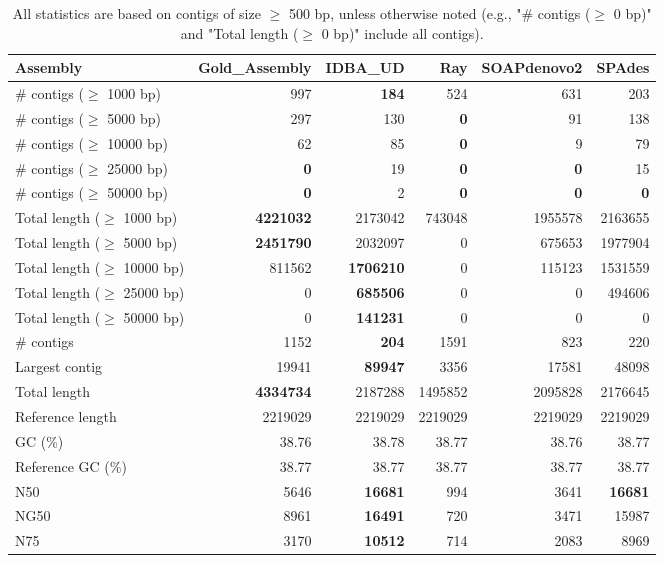 \documentclass[12pt,a4paper]{article}
\begin{document}
\begin{table}[ht]
\begin{center}
\caption{All statistics are based on contigs of size $\geq$ 500 bp, unless otherwise noted (e.g., "\# contigs ($\geq$ 0 bp)" and "Total length ($\geq$ 0 bp)" include all contigs).}
\begin{tabular}{|l*{5}{|r}|}
\hline
Assembly & Gold\_Assembly & IDBA\_UD & Ray & SOAPdenovo2 & SPAdes \\ \hline
\# contigs ($\geq$ 1000 bp) & 997 & {\bf 184} & 524 & 631 & 203 \\ \hline
\# contigs ($\geq$ 5000 bp) & 297 & 130 & {\bf 0} & 91 & 138 \\ \hline
\# contigs ($\geq$ 10000 bp) & 62 & 85 & {\bf 0} & 9 & 79 \\ \hline
\# contigs ($\geq$ 25000 bp) & {\bf 0} & 19 & {\bf 0} & {\bf 0} & 15 \\ \hline
\# contigs ($\geq$ 50000 bp) & {\bf 0} & 2 & {\bf 0} & {\bf 0} & {\bf 0} \\ \hline
Total length ($\geq$ 1000 bp) & {\bf 4221032} & 2173042 & 743048 & 1955578 & 2163655 \\ \hline
Total length ($\geq$ 5000 bp) & {\bf 2451790} & 2032097 & 0 & 675653 & 1977904 \\ \hline
Total length ($\geq$ 10000 bp) & 811562 & {\bf 1706210} & 0 & 115123 & 1531559 \\ \hline
Total length ($\geq$ 25000 bp) & 0 & {\bf 685506} & 0 & 0 & 494606 \\ \hline
Total length ($\geq$ 50000 bp) & 0 & {\bf 141231} & 0 & 0 & 0 \\ \hline
\# contigs & 1152 & {\bf 204} & 1591 & 823 & 220 \\ \hline
Largest contig & 19941 & {\bf 89947} & 3356 & 17581 & 48098 \\ \hline
Total length & {\bf 4334734} & 2187288 & 1495852 & 2095828 & 2176645 \\ \hline
Reference length & 2219029 & 2219029 & 2219029 & 2219029 & 2219029 \\ \hline
GC (\%) & 38.76 & 38.78 & 38.77 & 38.76 & 38.77 \\ \hline
Reference GC (\%) & 38.77 & 38.77 & 38.77 & 38.77 & 38.77 \\ \hline
N50 & 5646 & {\bf 16681} & 994 & 3641 & {\bf 16681} \\ \hline
NG50 & 8961 & {\bf 16491} & 720 & 3471 & 15987 \\ \hline
N75 & 3170 & {\bf 10512} & 714 & 2083 & 8969 \\ \hline

\end{tabular}
\end{center}
\end{table}
\end{document}
